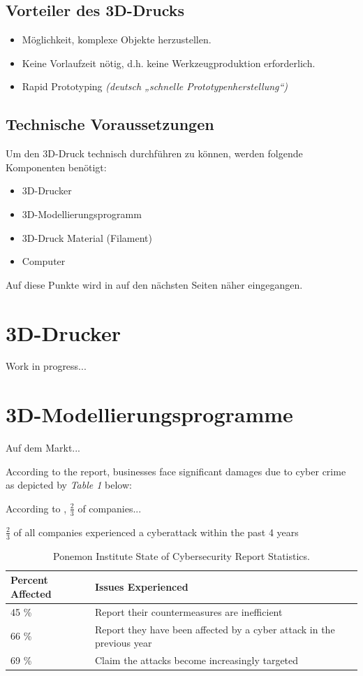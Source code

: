\subsection{Vorteiler des 3D-Drucks}

\begin{itemize}
	\item Möglichkeit, komplexe Objekte herzustellen.
	\item Keine Vorlaufzeit nötig, d.h. keine Werkzeugproduktion erforderlich.
	\item Rapid Prototyping \emph{(deutsch „schnelle Prototypenherstellung“)}
\end{itemize}

\subsection{Technische Voraussetzungen}
Um den 3D-Druck technisch durchführen zu können, werden folgende Komponenten benötigt:
\begin{itemize} 
\item 3D-Drucker 
\item 3D-Modellierungsprogramm
\item 3D-Druck Material (Filament)
\item Computer
\end{itemize}
Auf diese Punkte wird in auf den nächsten Seiten näher eingegangen.

\section{3D-Drucker}
Work in progress...


\section{3D-Modellierungsprogramme}
Auf dem Markt...


According to the report, businesses face significant damages due to cyber crime as depicted by \emph{Table 1} below: 

According to \textcite{embroker}, $\frac{2}{3}$ of companies...

$\frac{2}{3}$ of all companies experienced a cyberattack within the past 4 years \parencite{embroker}

\begin{table} [H]
	\begin{tabular}{ |p{2cm}|p{11.0cm}| }
		\hline
		\textbf{Percent Affected}& \textbf{Issues Experienced}\\
		\hline
		45 \% & Report their countermeasures are inefficient  \\ 
		66 \% & Report they have been affected by a cyber attack in the previous year  \\  
		69 \% & Claim the attacks become increasingly targeted \\  
		\hline
	\end{tabular}
	\caption{\label{tab:CyberSecReport}Ponemon Institute State of Cybersecurity Report Statistics.}
\end{table}

